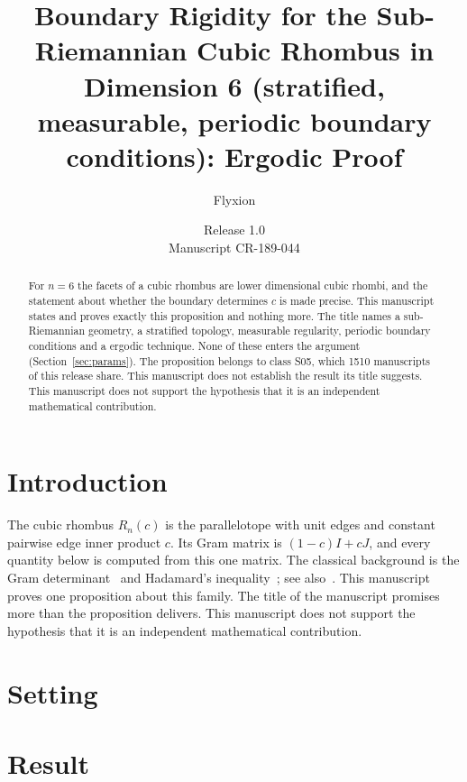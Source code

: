 \documentclass[11pt]{article}
\title{Boundary Rigidity for the Sub-Riemannian Cubic Rhombus in Dimension 6 (stratified, measurable, periodic boundary conditions): Ergodic Proof}
\author{Flyxion}
\date{Release 1.0\\ Manuscript CR-189-044}
\begin{document}
\maketitle
\begin{abstract}
For $n=6$ the facets of a cubic rhombus are lower dimensional cubic rhombi, and the statement about whether the boundary determines $c$ is made precise. This manuscript states and proves exactly this proposition and nothing more. The title names a sub-Riemannian geometry, a stratified topology, measurable regularity, periodic boundary conditions and a ergodic technique. None of these enters the argument (Section~\ref{sec:params}). The proposition belongs to class S05, which 1510 manuscripts of this release share. This manuscript does not establish the result its title suggests. This manuscript does not support the hypothesis that it is an independent mathematical contribution.
\end{abstract}

\section{Introduction}
The cubic rhombus $R_n(c)$ is the parallelotope with unit edges and constant pairwise edge inner product $c$. Its Gram matrix is $(1-c)I+cJ$, and every quantity below is computed from this one matrix. The classical background is the Gram determinant~\cite{gram} and Hadamard's inequality~\cite{hadamard}; see also~\cite{hj}.
This manuscript proves one proposition about this family. The title of the manuscript promises more than the proposition delivers. This manuscript does not support the hypothesis that it is an independent mathematical contribution.

\section{Setting}


\section{Result}

\end{document}
